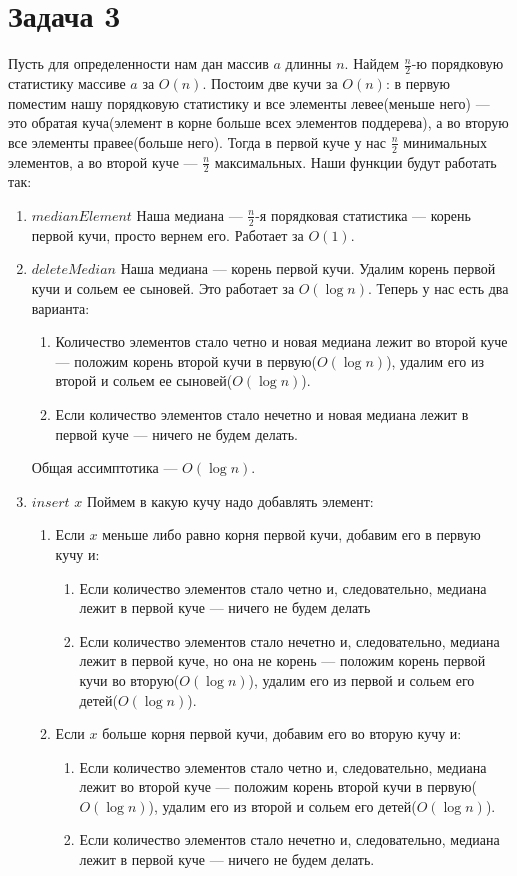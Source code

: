 \documentclass{article}
\begin{document}
\section{Задача 3}
Пусть для определенности нам дан массив $a$ длинны $n$. Найдем $\frac{n}{2}$-ю порядковую статистику массиве $a$ за $O(n)$. Постоим две кучи за $O(n)$: в первую поместим нашу порядковую статистику и все элементы левее(меньше него) --- это обратая куча(элемент в корне больше всех элементов поддерева), а во вторую все элементы правее(больше него). Тогда в первой куче у нас $\frac{n}{2}$ минимальных элементов, а во второй куче --- $\frac{n}{2}$ максимальных. Наши функции будут работать так:
\begin{enumerate}
\item $medianElement$\newline
Наша медиана --- $\frac{n}{2}$-я порядковая статистика --- корень первой кучи, просто вернем его. Работает за $O(1)$.
\item $deleteMedian$\newline
Наша медиана --- корень первой кучи. Удалим корень первой кучи и сольем ее сыновей. Это работает за $O(\log{n})$. Теперь у нас есть два варианта:
\begin{enumerate}
\item Количество элементов стало четно и новая медиана лежит во второй куче --- положим корень второй кучи в первую($O(\log{n})$), удалим его из второй и сольем ее сыновей($O(\log{n})$).
\item Если количество элементов стало нечетно и новая медиана лежит в первой куче --- ничего не будем делать.
\end{enumerate}
Общая ассимптотика --- $O(\log{n})$.
\item $insert$ $x$\newline
Поймем в какую кучу надо добавлять элемент:
\begin{enumerate}
\item Если $x$ меньше либо равно корня первой кучи, добавим его в первую кучу и:
\begin{enumerate}
\item Если количество элементов стало четно и, следовательно, медиана лежит в первой куче --- ничего не будем делать
\item Если количество элементов стало нечетно и, следовательно, медиана лежит в первой куче, но она не корень --- положим корень первой кучи во вторую($O(\log{n})$), удалим его из первой и сольем его детей($O(\log{n})$).
\end{enumerate}
\item Если $x$ больше корня первой кучи, добавим его во вторую кучу и:
\begin{enumerate}
\item Если количество элементов стало четно и, следовательно, медиана лежит во второй куче --- положим корень второй кучи в первую($O(\log{n})$), удалим его из второй и сольем его детей($O(\log{n})$).
\item Если количество элементов стало нечетно и, следовательно, медиана лежит в первой куче --- ничего не будем делать.
\end{enumerate}
\end{enumerate}
\end{enumerate}
\end{document}
